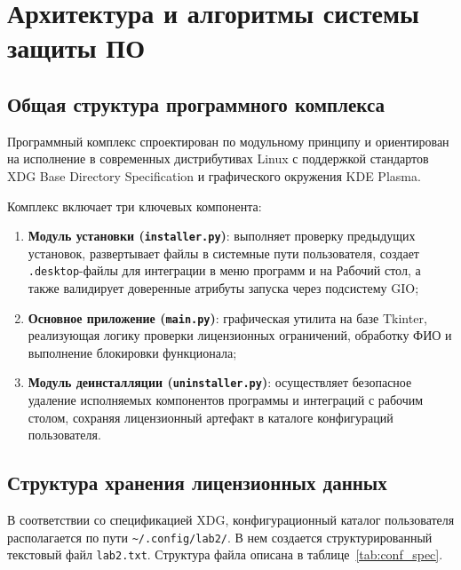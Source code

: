 \documentclass[a4paper]{article}
\begin{document}
\newpage
\section{Архитектура и алгоритмы системы защиты ПО}

\subsection{Общая структура программного комплекса}
Программный комплекс спроектирован по модульному принципу и ориентирован на исполнение в современных дистрибутивах Linux с поддержкой стандартов XDG Base Directory Specification и графического окружения KDE Plasma.

Комплекс включает три ключевых компонента:
\begin{enumerate}
    \item \textbf{Модуль установки (\texttt{installer.py})}: выполняет проверку предыдущих установок, развертывает файлы в системные пути пользователя, создает \texttt{.desktop}-файлы для интеграции в меню программ и на Рабочий стол, а также валидирует доверенные атрибуты запуска через подсистему GIO;
    \item \textbf{Основное приложение (\texttt{main.py})}: графическая утилита на базе Tkinter, реализующая логику проверки лицензионных ограничений, обработку ФИО и выполнение блокировки функционала;
    \item \textbf{Модуль деинсталляции (\texttt{uninstaller.py})}: осуществляет безопасное удаление исполняемых компонентов программы и интеграций с рабочим столом, сохраняя лицензионный артефакт в каталоге конфигураций пользователя.
\end{enumerate}


\subsection{Структура хранения лицензионных данных}
В соответствии со спецификацией XDG, конфигурационный каталог пользователя располагается по пути \texttt{\textasciitilde/.config/lab2/}. В нем создается структурированный текстовый файл \texttt{lab2.txt}. Структура файла описана в таблице~\ref{tab:conf_spec}.
\end{document}
